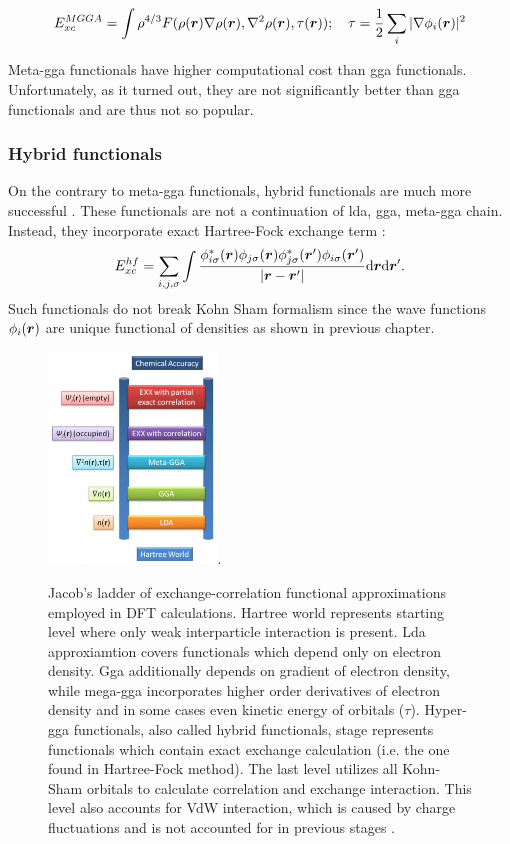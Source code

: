 \documentclass[openany, longbibliography,slovene,a4paper,12pt]{article}
\def\vec#1{\mbox{\boldmath$#1$}}
\newcommand{\dif}{\mathrm{d}}
\begin{document}
\begin{equation}
  E_{xc}^{MGGA}= \int \rho^{4/3}F(\rho(\vec r) \nabla \rho(\vec r), \nabla^2 \rho(\vec r), \tau(\vec r)); \quad \tau=\frac{1}{2}\sum_i |\nabla \phi_i(\vec r)|^2
   \end{equation}

Meta-gga functionals have higher computational cost than gga functionals.
Unfortunately, as it turned out, they are not significantly better than gga
functionals and are thus not so popular.


\subsubsection{Hybrid functionals}
On the contrary to meta-gga functionals, hybrid functionals are much more
successful \cite{challenges_den_fun_theor}. These functionals are not a
continuation of lda, gga, meta-gga chain. Instead, they incorporate exact
Hartree-Fock exchange term \cite{challenges_den_fun_theor}:
\begin{equation}
  E^{hf}_{xc}=\sum_ {i,j,\sigma}\int\frac{\phi^*_{i\sigma}(\vec r) \phi_{j\sigma}(\vec r) \phi^*_{j\sigma}(\vec r') \phi_{i\sigma}(\vec r')}{|\vec r - \vec r'|}\dif \vec r \dif \vec r'.
\end{equation}
Such functionals do not break Kohn Sham formalism since the wave functions
$\phi_i(\vec r)$ are unique functional of densities as shown in previous chapter.


\begin{figure}[!ht]
  \centering
  \includegraphics[width=0.4\textwidth]{jacobs_functional_ladder_ver2.png}.
  \caption{Jacob’s ladder of exchange-correlation functional approximations
    employed in DFT calculations. Hartree world represents starting level where only
    weak interparticle interaction is present. Lda approxiamtion covers
    functionals which depend only on electron density. Gga additionally depends
    on gradient of electron density, while mega-gga incorporates higher order
    derivatives of electron density and in some cases even kinetic energy of
    orbitals ($\tau$). Hyper-gga functionals, also called hybrid functionals,
    stage represents functionals which contain exact exchange calculation (i.e.
    the one found in Hartree-Fock method). The last level utilizes all Kohn-Sham
    orbitals to calculate correlation and exchange interaction. This level also
    accounts for VdW interaction, which is caused by charge fluctuations and is
    not accounted for in previous stages \cite{How_theo_simul_can_address}.
  }
  \label{bijection}
\end{figure}
\end{document}
